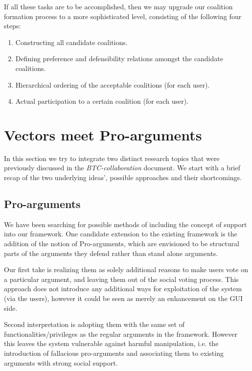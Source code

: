 \documentclass{article}
\begin{document}
If all these tasks are to be accomplished, then we may upgrade our coalition formation process to a more sophisticated level, consisting of the following four steps:

\begin{enumerate}
\item Constructing  all candidate coalitions.
\item Defining preference and defensibility relations amongst the candidate coalitions.
\item  Hierarchical ordering of the acceptable coalitions (for each user).
\item Actual participation to a certain coalition (for each user).
\end{enumerate}





\section{Vectors meet Pro-arguments}

In this section we try to integrate two distinct research topics that were previously discussed in the \emph{BTC-collaboration} document. We start with a brief recap of the two underlying ideas', possible approaches and their shortcomings.

\subsection{Pro-arguments}

We have been searching for possible methods of including the concept of support into our framework. One candidate extension to the existing framework is the addition of the notion of Pro-arguments, which are envisioned to be structural parts of the arguments they defend rather than stand alone arguments.

Our first take is realizing them as solely additional reasons to make users vote on a particular argument, and leaving them out of the social voting process. This approach does not introduce any additional ways for exploitation of the system (via the users), however it could be seen as merely an enhancement on the GUI side.

Second interpretation is adopting them with the same set of functionalities/privileges as the regular arguments in the framework. However this leaves the system vulnerable against harmful manipulation, i.e. the introduction of fallacious pro-arguments and associating them to existing arguments with strong social support.
\end{document}
